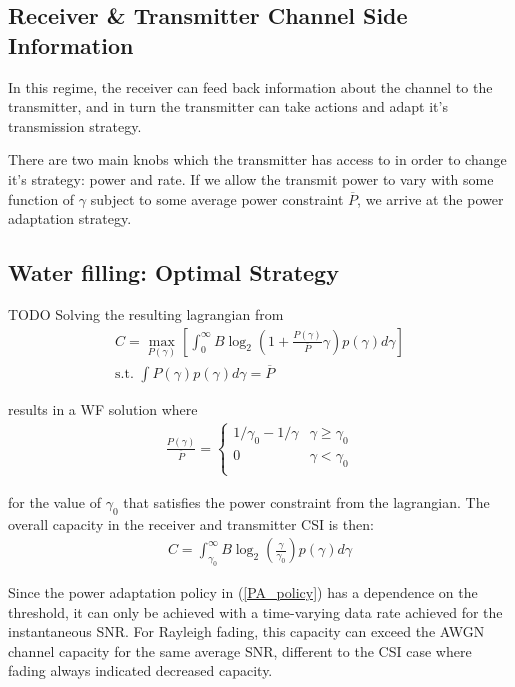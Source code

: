 \documentclass[12pt]{report} %
\begin{document}
\subsection{Receiver \& Transmitter Channel Side Information}
In this regime, the receiver can feed back information about the channel to the transmitter, and in turn the transmitter can take actions and adapt it's transmission strategy.

There are two main knobs which the transmitter has access to in order to change it's strategy: power and rate. If we allow the transmit power to vary with some function of $\gamma$ subject to some average power constraint $\overline{P}$, we arrive at the power adaptation strategy.

\subsection*{Water filling: Optimal Strategy}
TODO
Solving the resulting lagrangian from
\begin{align}
  C = \max_{P(\gamma)} \left[ \int_{0}^{\infty}B \log_2 (1 + \frac{P(\gamma)}{\overline{P}}\gamma)p(\gamma) d\gamma\right] \nonumber \\
  \text{s.t. } \int P(\gamma)p(\gamma)d\gamma = \overline{P}
\end{align}

results in a \gls{WF} solution where
\begin{align} \label{PA_policy}
  \frac{P(\gamma)}{\overline{P}} = \left\{ \begin{array}{ll}
                                             1/\gamma_0 - 1/\gamma & \gamma \geq \gamma_0 \\
                                             0                     & \gamma < \gamma_0    \\
                                           \end{array}
  \right.
\end{align}

for the value of $\gamma_0$ that satisfies the power constraint from the lagrangian. The overall capacity in the receiver and transmitter \gls{CSI} is then:
\begin{align}
  C = \int_{\gamma_0}^{\infty} B \log_{2} (\frac{\gamma}{\gamma_0})p(\gamma)d\gamma
\end{align}

Since the power adaptation policy in (\ref{PA_policy}) has a dependence on the threshold, it can only be achieved with a time-varying data rate achieved for the instantaneous \gls{SNR}. For Rayleigh fading, this capacity can exceed the AWGN channel capacity for the same average SNR, different to the \gls{CSI} case where fading always indicated decreased capacity.
\end{document}
